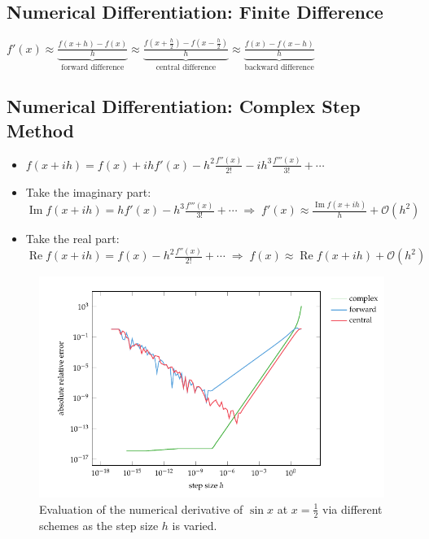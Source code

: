 \documentclass[10pt]{extarticle}
\newcommand{\ds}{\displaystyle}
\newcommand{\ie}{\;\Longrightarrow\;}
\DeclareMathOperator*{\im}{Im}
\DeclareMathOperator*{\re}{Re}
\theoremstyle{definition}
\begin{document}
\newpage

\subsection*{Numerical Differentiation: Finite Difference}

$\ds f'(x)\approx\underbrace{\frac{f(x + h) - f(x)}{h}}_{\text{forward difference}}\approx\underbrace{\frac{f(x + \frac{h}{2}) - f(x - \frac{h}{2})}{h}}_{\text{central difference}}\approx\underbrace{\frac{f(x) - f(x - h)}{h}}_{\text{backward difference}}$

\subsection*{Numerical Differentiation: Complex Step Method}

\begin{itemize}
  \item $\ds f(x + ih) = f(x) + ihf'(x) - h^2\frac{f''(x)}{2!} - ih^3\frac{f'''(x)}{3!} + \cdots$
  \item Take the imaginary part: $\ds\im f(x + ih) = hf'(x) - h^3\frac{f'''(x)}{3!} + \cdots\ie f'(x) \approx \frac{\im f(x + ih)}{h} + \mathcal{O}(h^2)$ 
  \item Take the real part: $\ds\re f(x + ih) = f(x) - h^2\frac{f''(x)}{2!} + \cdots\ie f(x) \approx\re f(x + ih) + \mathcal{O}(h^2)$ 
\end{itemize}

\newpage

\begin{figure}[!htbp]
  \centering
  \includegraphics[scale=0.8,page=1]{fig/ndiff.pdf}
  \caption{Evaluation of the numerical derivative of $\sin x$ at $x = \frac{1}{2}$ via different schemes as the step size $h$ is varied.}
\end{figure}
\end{document}
